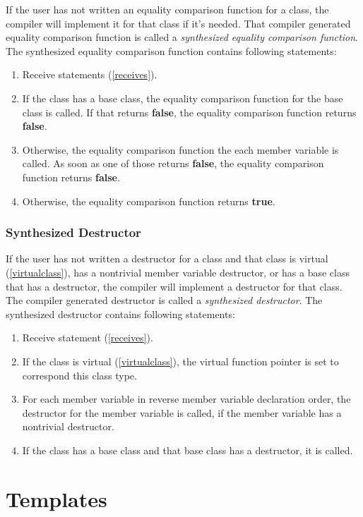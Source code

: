 \documentclass[a4paper,oneside,11pt]{book}
\theoremstyle{definition}
\begin{document}
If the user has not written an equality comparison function for a class, the compiler will implement it for that class if it's needed.
That compiler generated equality comparison function is called a \emph{synthesized equality comparison function}.
The synthesized equality comparison function contains following statements:
\begin{enumerate}
\item
Receive statements (\ref{receives}).
\item
If the class has a base class, the equality comparison function for the base class is called.
If that returns \textbf{false}, the equality comparison function returns \textbf{false}.
\item
Otherwise, the equality comparison function the each member variable is called. As soon as one of those returns \textbf{false},
the equality comparison function returns \textbf{false}.
\item
Otherwise, the equality comparison function returns \textbf{true}.
\end{enumerate}

\subsection{Synthesized Destructor}

If the user has not written a destructor for a class and that class is virtual (\ref{virtualclass}), has a nontrivial member variable destructor,
or has a base class that has a destructor, the compiler will implement a destructor for that class.
The compiler generated destructor is called a \emph{synthesized destructor}.
The synthesized destructor contains following statements:
\begin{enumerate}
\item
Receive statement (\ref{receives}).
\item
If the class is virtual (\ref{virtualclass}), the virtual function pointer is set to correspond this class type.
\item
For each member variable in reverse member variable declaration order, the destructor for the member variable is called,
if the member variable has a nontrivial destructor.
\item
If the class has a base class and that base class has a destructor, it is called.
\end{enumerate}

\chapter{Templates}
\end{document}
